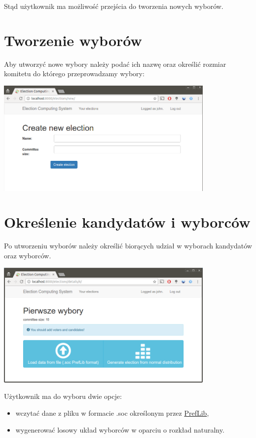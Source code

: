 \documentclass[pdflatex,11pt]{../aghdoc}
\begin{document}
Stąd użytkownik ma możliwość przejścia do tworzenia nowych wyborów.


\section{Tworzenie wyborów}
\label{sec:electionscreate}

Aby utworzyć nowe wybory należy podać ich nazwę oraz określić rozmiar komitetu do którego przeprowadzamy wybory:

\includegraphics[width=0.8\textwidth]{pics/elections-new.png}

\newpage
\section{Określenie kandydatów i wyborców}
\label{sec:electionsnewlycreated}

Po utworzeniu wyborów należy określić biorących udział w wyborach kandydatów oraz wyborców.

\includegraphics[width=0.8\textwidth]{pics/elections-config.png}

Użytkownik ma do wyboru dwie opcje:
\begin{itemize}
\item wczytać dane z pliku w formacie .soc określonym przez \href{http://www.preflib.org/}{PrefLib},
\item wygenerować losowy układ wyborców w oparciu o rozkład naturalny.
\end{itemize}
\end{document}
